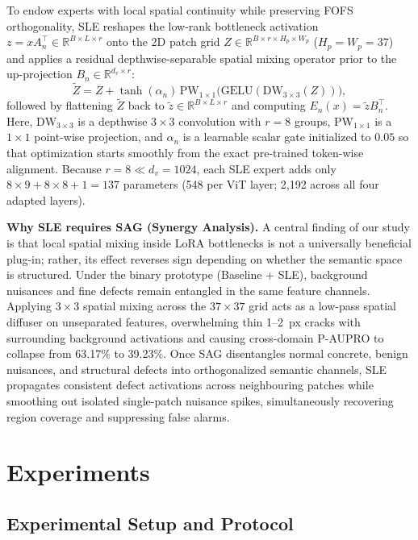\documentclass[conference]{IEEEtran}
\newcommand{\sag}{SAG}
\newcommand{\sle}{SLE}
\begin{document}
To endow experts with local spatial continuity while preserving FOFS orthogonality, \sle{} reshapes the low-rank bottleneck activation $z = x A_n^\top \in \mathbb{R}^{B \times L \times r}$ onto the 2D patch grid $Z \in \mathbb{R}^{B \times r \times H_p \times W_p}$ ($H_p{=}W_p{=}37$) and applies a residual depthwise-separable spatial mixing operator prior to the up-projection $B_n \in \mathbb{R}^{d_v \times r}$:
\begin{equation}
\tilde{Z} = Z + \tanh(\alpha_n)\, \mathrm{PW}_{1\times 1}\big(\mathrm{GELU}(\mathrm{DW}_{3\times 3}(Z))\big),
\label{eq:sle}
\end{equation}
followed by flattening $\tilde{Z}$ back to $\tilde{z} \in \mathbb{R}^{B \times L \times r}$ and computing $E_n(x) = \tilde{z} B_n^\top$. Here, $\mathrm{DW}_{3\times 3}$ is a depthwise $3{\times}3$ convolution with $r{=}8$ groups, $\mathrm{PW}_{1\times 1}$ is a $1{\times}1$ point-wise projection, and $\alpha_n$ is a learnable scalar gate initialized to $0.05$ so that optimization starts smoothly from the exact pre-trained token-wise alignment. Because $r{=}8 \ll d_v{=}1024$, each \sle{} expert adds only $8{\times}9 + 8{\times}8 + 1 = 137$ parameters (548 per ViT layer; 2,192 across all four adapted layers).

\textbf{Why \sle{} requires \sag{} (Synergy Analysis).} A central finding of our study is that local spatial mixing inside LoRA bottlenecks is not a universally beneficial plug-in; rather, its effect reverses sign depending on whether the semantic space is structured. Under the binary prototype (Baseline + \sle{}), background nuisances and fine defects remain entangled in the same feature channels. Applying $3{\times}3$ spatial mixing across the $37{\times}37$ grid acts as a low-pass spatial diffuser on unseparated features, overwhelming thin 1--2~px cracks with surrounding background activations and causing cross-domain P-AUPRO to collapse from 63.17\% to 39.23\%. Once \sag{} disentangles normal concrete, benign nuisances, and structural defects into orthogonalized semantic channels, \sle{} propagates consistent defect activations across neighbouring patches while smoothing out isolated single-patch nuisance spikes, simultaneously recovering region coverage and suppressing false alarms.

\section{Experiments}
\label{sec:exp}


\subsection{Experimental Setup and Protocol}
\end{document}

